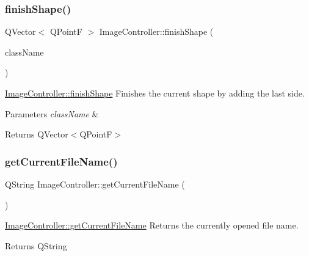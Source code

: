 \subsubsection{\texorpdfstring{finish\+Shape()}{finishShape()}}
{\footnotesize\ttfamily Q\+Vector$<$ Q\+PointF $>$ Image\+Controller\+::finish\+Shape (\begin{DoxyParamCaption}\item[{const Q\+String \&}]{class\+Name }\end{DoxyParamCaption})}



\hyperlink{classImageController_aaabc0506bd421fc0abf5b06ffc1c7032}{Image\+Controller\+::finish\+Shape} Finishes the current shape by adding the last side. 


\begin{DoxyParams}{Parameters}
{\em class\+Name} & \\
\hline
\end{DoxyParams}
\begin{DoxyReturn}{Returns}
Q\+Vector$<$\+Q\+Point\+F$>$ 
\end{DoxyReturn}
\mbox{\label{classImageController_a5f225db05c8ec80017a05494ada72974}} 
\subsubsection{\texorpdfstring{get\+Current\+File\+Name()}{getCurrentFileName()}}
{\footnotesize\ttfamily Q\+String Image\+Controller\+::get\+Current\+File\+Name (\begin{DoxyParamCaption}{ }\end{DoxyParamCaption})}



\hyperlink{classImageController_a5f225db05c8ec80017a05494ada72974}{Image\+Controller\+::get\+Current\+File\+Name} Returns the currently opened file name. 

\begin{DoxyReturn}{Returns}
Q\+String 
\end{DoxyReturn}
\mbox{\label{classImageController_aa34adc44b0ff9719cc998bc89d3bf5b0}} 
